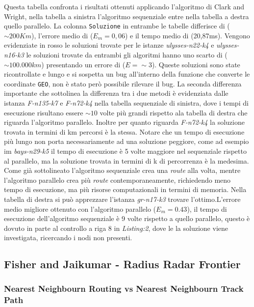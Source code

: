 \documentclass[]{article}
\begin{document}
Questa tabella confronta i risultati ottenuti applicando l'algoritmo di Clark and Wright, nella tabella a sinistra l'algoritmo sequenziale entre nella tabella a destra quello parallelo. La colonna \texttt{Soluzione} in entrambe le tabelle differisce di ($\sim 200Km$), l'errore medio di ($E_m=0,06$) e il tempo medio di (20,87ms).
Vengono evidenziate in rosso le soluzioni trovate per le istanze \textit{ulysses-n22-k4} e \textit{ulysses-n16-k3} le soluzioni trovate da entrambi gli algoritmi hanno uno scarto di ($\sim 100.000 km$) presentando un errore di ($ E =\sim 3$). Queste soluzioni sono state ricontrollate e lungo e si sospetta un bug all'interno della funzione che converte le coordinate \texttt{GEO}, non è stato però possibile rilevare il bug.
La seconda differenza importante che sottolinea la differenza tra i due metodi è evidenziata dalle istanza  \textit{F-n135-k7} e \textit{F-n72-k4} nella tabella sequenziale di sinistra, dove i tempi di esecuzione risultano essere $\sim 10$ volte più grandi rispetto ala tabella di destra che riguarda l'algoritmo parallelo.
Inoltre per quanto riguarda  \textit{F-n72-k4} la soluzione trovata in termini di km percorsi è la stessa.
Notare che un tempo di esecuzione più lungo non porta necessariamente ad una soluzione peggiore, come ad esempio im \textit{bays-n29-k5} il tempo di esecuzione è 5 volte maggiore nel sequenziale rispetto al parallelo, ma la soluzione trovata in termini di k di percorrenza è la medesima. Come già sottolineato l'algoritmo sequenziale crea una \emph{route} alla volta, mentre l'algoritmo parallelo crea più \emph{route} contemporaneamente, richiedendo meno tempo di esecuzione, ma più risorse computazionali in termini di memoria.
Nella tabella di destra si può apprezzare l'istanza \emph{gr-n17-k3} trovare l'ottimo.L'errore medio migliore ottenuto con l'algoritmo parallelo ($E_m= 0.43$), il tempo di esecuzione dell'algoritmo sequenziale è 9 volte rispetto a quello parallelo, questo è dovuto in parte al controllo a riga 8 in \textit{Listing:2}, dove le la soluzione viene investigata, ricercando i nodi non presenti.
\subsection{Fisher and Jaikumar - Radius Radar Frontier}

\subsubsection{Nearest Neighbourn Routing vs Nearest Neighbourn Track Path }
\end{document}
